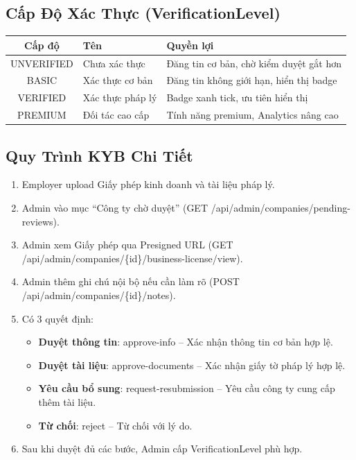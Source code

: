\documentclass[12pt, a4paper]{report}
\begin{document}
\subsection{Cấp Độ Xác Thực (VerificationLevel)}

\begin{center}
\begin{tabular}{|c|p{4cm}|p{7cm}|}
\hline
\textbf{Cấp độ} & \textbf{Tên} & \textbf{Quyền lợi} \\
\hline
UNVERIFIED & Chưa xác thực & Đăng tin cơ bản, chờ kiểm duyệt gắt hơn \\
\hline
BASIC & Xác thực cơ bản & Đăng tin không giới hạn, hiển thị badge \\
\hline
VERIFIED & Xác thực pháp lý & Badge xanh tick, ưu tiên hiển thị \\
\hline
PREMIUM & Đối tác cao cấp & Tính năng premium, Analytics nâng cao \\
\hline
\end{tabular}
\end{center}

\subsection{Quy Trình KYB Chi Tiết}

\begin{enumerate}
    \item Employer upload Giấy phép kinh doanh và tài liệu pháp lý.
    \item Admin vào mục ``Công ty chờ duyệt'' (GET /api/admin/companies/pending-reviews).
    \item Admin xem Giấy phép qua Presigned URL (GET /api/admin/companies/\{id\}/business-license/view).
    \item Admin thêm ghi chú nội bộ nếu cần làm rõ (POST /api/admin/companies/\{id\}/notes).
    \item Có 3 quyết định:
    \begin{itemize}
        \item \textbf{Duyệt thông tin}: approve-info -- Xác nhận thông tin cơ bản hợp lệ.
        \item \textbf{Duyệt tài liệu}: approve-documents -- Xác nhận giấy tờ pháp lý hợp lệ.
        \item \textbf{Yêu cầu bổ sung}: request-resubmission -- Yêu cầu công ty cung cấp thêm tài liệu.
        \item \textbf{Từ chối}: reject -- Từ chối với lý do.
    \end{itemize}
    \item Sau khi duyệt đủ các bước, Admin cấp VerificationLevel phù hợp.
\end{enumerate}
\end{document}
